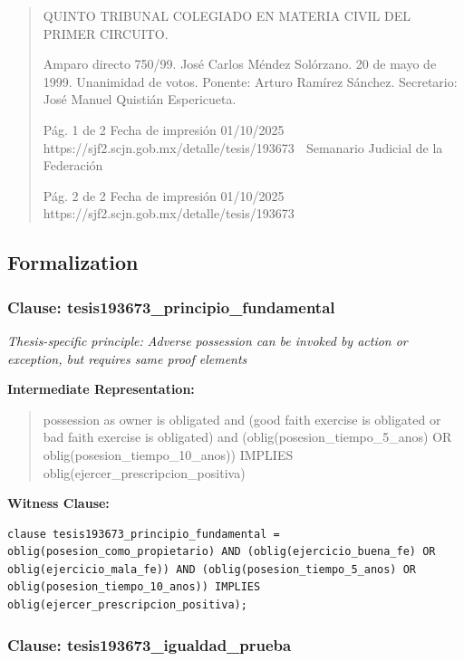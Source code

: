 \documentclass[11pt,a4paper]{article}
\begin{document}
\begin{quote}
QUINTO TRIBUNAL COLEGIADO EN MATERIA CIVIL DEL PRIMER CIRCUITO.


Amparo directo 750/99. José Carlos Méndez Solórzano. 20 de mayo de 1999. Unanimidad de votos.
Ponente: Arturo Ramírez Sánchez. Secretario: José Manuel Quistián Espericueta.




                                             Pág. 1 de 2             Fecha de impresión 01/10/2025
  https://sjf2.scjn.gob.mx/detalle/tesis/193673
                                                Semanario Judicial de la Federación




                                           Pág. 2 de 2       Fecha de impresión 01/10/2025
https://sjf2.scjn.gob.mx/detalle/tesis/193673

\end{quote}

\subsection{Formalization}

\subsubsection{Clause: tesis193673\_principio\_fundamental}

\textit{Thesis-specific principle: Adverse possession can be invoked by action or exception, but requires same proof elements}

\textbf{Intermediate Representation:}

\begin{quote}
possession as owner is obligated and (good faith exercise is obligated or bad faith exercise is obligated) and (oblig(posesion\_tiempo\_5\_anos) OR oblig(posesion\_tiempo\_10\_anos)) IMPLIES oblig(ejercer\_prescripcion\_positiva)
\end{quote}

\textbf{Witness Clause:}

\begin{lstlisting}[style=witnessstyle, language=Witness]
clause tesis193673_principio_fundamental = oblig(posesion_como_propietario) AND (oblig(ejercicio_buena_fe) OR oblig(ejercicio_mala_fe)) AND (oblig(posesion_tiempo_5_anos) OR oblig(posesion_tiempo_10_anos)) IMPLIES oblig(ejercer_prescripcion_positiva);
\end{lstlisting}

\subsubsection{Clause: tesis193673\_igualdad\_prueba}
\end{document}

